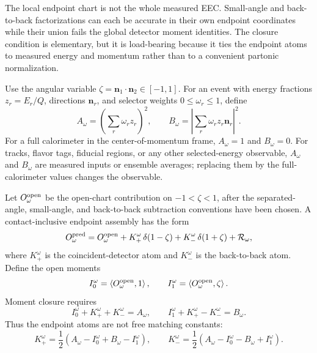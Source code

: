 \begin{controlledapproximation}
\label{ca:measured-eec-global-moment-closure}
The local endpoint chart is not the whole measured EEC.  Small-angle and
back-to-back factorizations can each be accurate in their own endpoint
coordinates while their union fails the global detector moment identities.  The
closure condition is elementary, but it is load-bearing because it ties the
endpoint atoms to measured energy and momentum rather than to a convenient
partonic normalization.

Use the angular variable
\(\zeta=\mathbf n_1\cdot\mathbf n_2\in[-1,1]\).  For an event with energy
fractions \(z_r=E_r/Q\), directions \(\mathbf n_r\), and selector weights
\(0\leq\omega_r\leq1\), define
\begin{equation}
  A_\omega
  =
  \left(\sum_r\omega_r z_r\right)^2,
  \qquad
  B_\omega
  =
  \left|\sum_r\omega_r z_r\mathbf n_r\right|^2 .
  \label{eq:measured-eec-selected-moments}
\end{equation}
For a full calorimeter in the center-of-momentum frame,
\(A_\omega=1\) and \(B_\omega=0\).  For tracks, flavor tags, fiducial regions,
or any other selected-energy observable, \(A_\omega\) and \(B_\omega\) are
measured inputs or ensemble averages; replacing them by the full-calorimeter
values changes the observable.

Let \(O_\omega^{\rm open}\) be the open-chart contribution on
\(-1<\zeta<1\), after the separated-angle, small-angle, and back-to-back
subtraction conventions have been chosen.  A contact-inclusive endpoint
assembly has the form
\begin{equation}
  O_\omega^{\rm pred}
  =
  O_\omega^{\rm open}
  +
  K_+^\omega\,\delta(1-\zeta)
  +
  K_-^\omega\,\delta(1+\zeta)
  +
  \mathcal R_\omega ,
  \label{eq:measured-eec-global-endpoint-decomposition}
\end{equation}
where \(K_+^\omega\) is the coincident-detector atom and \(K_-^\omega\) is the
back-to-back atom.  Define the open moments
\begin{equation}
  I_0^\omega=\left\langle O_\omega^{\rm open},1\right\rangle,
  \qquad
  I_1^\omega=\left\langle O_\omega^{\rm open},\zeta\right\rangle .
  \label{eq:measured-eec-open-moments}
\end{equation}
Moment closure requires
\begin{equation}
  I_0^\omega+K_+^\omega+K_-^\omega=A_\omega,
  \qquad
  I_1^\omega+K_+^\omega-K_-^\omega=B_\omega .
  \label{eq:measured-eec-moment-closure-equations}
\end{equation}
Thus the endpoint atoms are not free matching constants:
\begin{equation}
  K_+^\omega
  =
  \frac12\left(A_\omega-I_0^\omega+B_\omega-I_1^\omega\right),
  \qquad
  K_-^\omega
  =
  \frac12\left(A_\omega-I_0^\omega-B_\omega+I_1^\omega\right).
  \label{eq:measured-eec-endpoint-atom-solution}
\end{equation}


\end{controlledapproximation}
